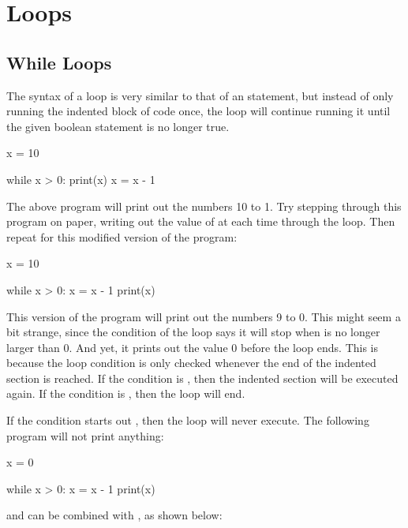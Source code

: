 \documentclass[11pt]{cselabheader}
\begin{document}
\pagebreak
\section{Loops}

\subsection{While Loops}
The syntax of a  loop is very similar to that of an
 statement, but instead of only running the indented block of code
once, the  loop will continue running it until the given
boolean statement is no longer true.

\begin{python3code}
x = 10

while x > 0:
    print(x)
    x = x - 1
\end{python3code}

The above program will print out the numbers 10 to 1. Try stepping through this
program on paper, writing out the value of  at each time through
the loop. Then repeat for this modified version of the program:

\begin{python3code}
x = 10

while x > 0:
    x = x - 1
    print(x)
\end{python3code}

This version of the program will print out the numbers 9 to 0. This might seem a
bit strange, since the condition of the loop says it will stop when
 is no longer larger than 0. And yet, it prints out the value 0
before the loop ends. This is because the loop condition is only checked
whenever the end of the indented section is reached. If the condition is
, then the indented section will be executed again. If the
condition is , then the loop will end.

If the condition starts out , then the loop will never execute.
The following program will not print anything:

\begin{python3code}
x = 0

while x > 0:
    x = x - 1
    print(x)
\end{python3code}

 and  can be combined with , as
shown below:
\end{document}
